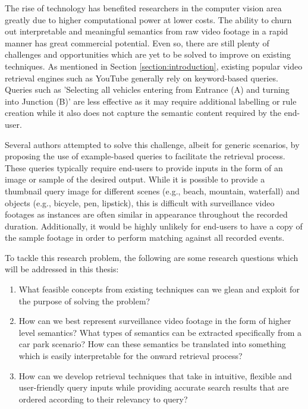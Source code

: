 
The rise of technology has benefited researchers in the computer vision area greatly due to higher computational power at lower costs. The ability to churn out interpretable and meaningful semantics from raw video footage in a rapid manner has great commercial potential. Even so, there are still plenty of challenges and opportunities which are yet to be solved to improve on existing techniques. As mentioned in Section \ref{section:introduction}, existing popular video retrieval engines such as YouTube generally rely on keyword-based queries. Queries such as 'Selecting all vehicles entering from Entrance (A) and turning into Junction (B)' are less effective as it may require additional labelling or rule creation while it also does not capture the semantic content required by the end-user.

Several authors attempted to solve this challenge,
albeit for generic scenarios,
by proposing the use of example-based queries \cite{zhang2017car, liu2016large, castanon2016retrieval} to facilitate the retrieval process.
These queries typically require end-users to provide inputs in the form of an image or sample of the desired output. While it is possible to provide a thumbnail query image for different scenes (e.g., beach, mountain, waterfall) and objects (e.g., bicycle, pen, lipstick), this is difficult with surveillance video footages as instances are often similar in appearance throughout the recorded duration. Additionally, it would be highly unlikely for end-users to have a copy of the sample footage in order to perform matching against all recorded events.

To tackle this research problem, the following are some research questions which will be addressed in this thesis:
\begin{enumerate}
\item What feasible concepts from existing techniques can we glean and exploit for the purpose of solving the problem?
\item How can we best represent surveillance video footage in the form of higher level semantics? What types of semantics can be extracted specifically from a car park scenario? How can these semantics be translated into something which is easily interpretable for the onward retrieval process?
\item How can we develop retrieval techniques that take in intuitive, flexible and user-friendly query inputs while providing accurate search results that are ordered according to their relevancy to query?
\end{enumerate}



